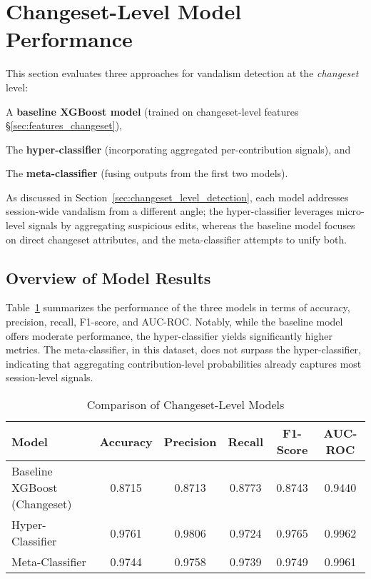 \documentclass[
    13pt, %
    a4paper, %
    DIV14, %
    listof=totoc, %
    bibliography=totoc, %
    index=totoc, %
    headsepline
]{scrreprt}
\begin{document}
\section{Changeset-Level Model Performance}
\label{sec:changeset_level_performance}

This section evaluates three approaches for vandalism detection at the \emph{changeset} level:
\begin{enumerate*}
    \item A \textbf{baseline XGBoost model} (trained on changeset-level features \S\ref{sec:features_changeset}),
    \item The \textbf{hyper-classifier} (incorporating aggregated per-contribution signals), and
    \item The \textbf{meta-classifier} (fusing outputs from the first two models).
\end{enumerate*}

\vspace{0.5em}
\noindent As discussed in Section~\ref{sec:changeset_level_detection}, each model addresses session-wide vandalism from a different angle; the hyper-classifier leverages micro-level signals by aggregating suspicious edits, whereas the baseline model focuses on direct changeset attributes, and the meta-classifier attempts to unify both.


\subsection{Overview of Model Results}

Table~\ref{tab:changeset_comparison} summarizes the performance of the three models in terms of accuracy, precision, recall, F1-score, and AUC-ROC. Notably, while the baseline model offers moderate performance, the hyper-classifier yields significantly higher metrics. The meta-classifier, in this dataset, does not surpass the hyper-classifier, indicating that aggregating contribution-level probabilities already captures most session-level signals.

\begin{table}[htbp]
    \centering
    \caption{Comparison of Changeset-Level Models}
    \label{tab:changeset_comparison}
    \begin{tabular}{lccccc}
    \toprule
    \textbf{Model} & \textbf{Accuracy} & \textbf{Precision} & \textbf{Recall} & \textbf{F1-Score} & \textbf{AUC-ROC}\\
    \midrule
    Baseline XGBoost (Changeset) & 0.8715 & 0.8713 & 0.8773 & 0.8743 & 0.9440 \\
    Hyper-Classifier             & 0.9761 & 0.9806 & 0.9724 & 0.9765 & 0.9962 \\
    Meta-Classifier              & 0.9744 & 0.9758 & 0.9739 & 0.9749 & 0.9961 \\
    \bottomrule
    \end{tabular}
\end{table}
\end{document}
